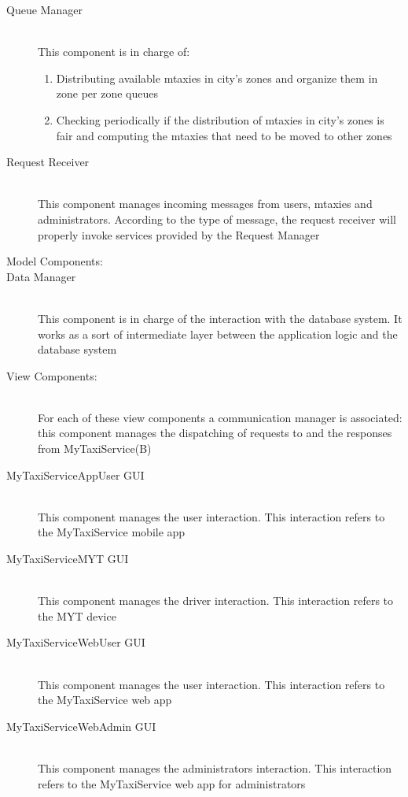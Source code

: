 \documentclass[11pt,titlepage]{article} %
\begin{document}
\begin{description}
		        \item [Queue Manager] \hfill \\
		            This component is in charge of:
			  \begin{enumerate}
			            \item Distributing available mtaxies in city's zones and organize them in zone per zone queues
			            \item Checking periodically if the distribution of mtaxies in city's zones is fair and computing the mtaxies
			            that need to be moved to other zones
			 \end{enumerate}
		        \item [Request Receiver] \hfill \\
		            This component manages incoming messages from users, mtaxies and administrators.
		            According to the type of message, the request receiver will properly invoke services provided by the Request Manager

	      \item [Model Components:] 
		        \item [Data Manager] \hfill \\
		            This component is in charge of the interaction with the database system. It works as a sort of
		            intermediate layer between the application logic and the database system
	
	      \item [View Components:] \hfill \\
		For each of these view components a communication manager is associated: this component manages the dispatching of requests to and the responses from MyTaxiService(B)
		        \item [MyTaxiServiceAppUser GUI]\hfill \\
		            This component manages the user interaction. This interaction refers to the
		            MyTaxiService mobile app
		        \item [MyTaxiServiceMYT GUI] \hfill \\
		            This component manages the driver interaction. This interaction refers to
		            the MYT device
		        \item [MyTaxiServiceWebUser GUI] \hfill \\
		          This component manages the user interaction. This interaction refers to
		          the MyTaxiService web app
		        \item [MyTaxiServiceWebAdmin GUI] \hfill \\
		          This component manages the administrators interaction. This interaction refers to
		          the MyTaxiService web app for administrators
	\end{description}
\end{document}
